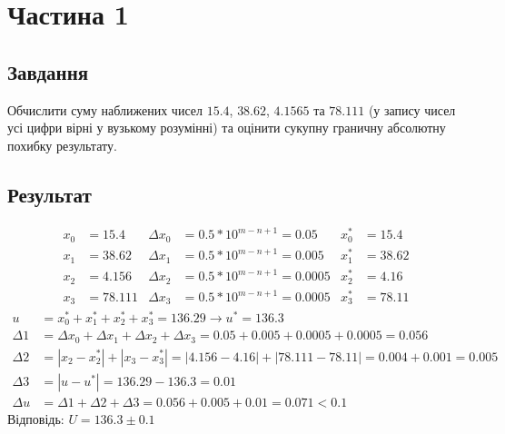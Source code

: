 \section{Частина 1}
\label{sec:task1}

\subsection{Завдання}
\label{subsec:task1_task}

Обчислити суму наближених чисел
$15.4$, $38.62$, $4.1565$ та $78.111$
(у запису чисел усі цифри вірні у вузькому розумінні)
та оцінити сукупну граничну абсолютну похибку результату.

\subsection{Результат}
\label{subsec:task1_result}

\begin{align*}
    x_0 & = 15.4   & \Delta x_0 & = 0.5 * 10^{m - n + 1} = 0.05   & x_0^* & = 15.4  \\
    x_1 & = 38.62  & \Delta x_1 & = 0.5 * 10^{m - n + 1} = 0.005  & x_1^* & = 38.62 \\
    x_2 & = 4.156  & \Delta x_2 & = 0.5 * 10^{m - n + 1} = 0.0005 & x_2^* & = 4.16  \\
    x_3 & = 78.111 & \Delta x_3 & = 0.5 * 10^{m - n + 1} = 0.0005 & x_3^* & = 78.11
\end{align*}
\begin{align*}
    u        & = x_0^* + x_1^* + x_2^* + x_3^* = 136.29 \rightarrow u^* = 136.3                             \\
    \Delta 1 & = \Delta x_0 + \Delta x_1 + \Delta x_2 + \Delta x_3 = 0.05 + 0.005 + 0.0005 + 0.0005 = 0.056 \\
    \Delta 2 & = |x_2 - x_2^*| + |x_3 - x_3^*| = |4.156 - 4.16| + |78.111 - 78.11| = 0.004 + 0.001 = 0.005  \\
    \Delta 3 & = |u - u^*| = 136.29 - 136.3 = 0.01                                                          \\
    \Delta u & = \Delta 1 + \Delta 2 + \Delta 3 = 0.056 + 0.005 + 0.01 = 0.071 < 0.1
\end{align*}
Відповідь: $U = 136.3 \pm 0.1$
